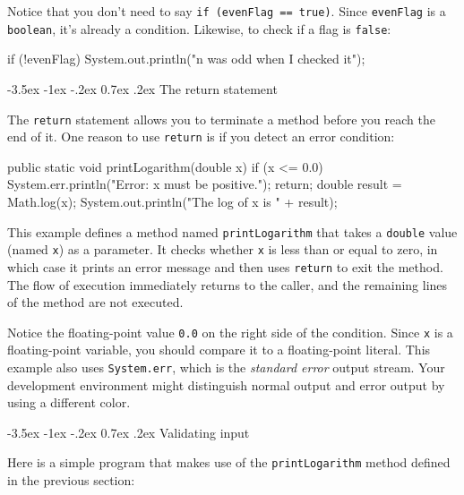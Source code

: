 \documentclass[12pt]{book}
\makeatletter
\theoremstyle{exercise}
\newcommand{\java}[1]{\verb"#1"}
\renewcommand{\section}{\@startsection{section}{1}{\z@}%
    {-3.5ex \@plus -1ex \@minus -.2ex}%
    {0.7ex \@plus.2ex}%
    {\normalfont\Large\bfseries}}
\newcommand{\java}[1]{\lstinline{#1}} %
\makeatother
\begin{document}
Notice that you don't need to say \java{if (evenFlag == true)}.
Since \java{evenFlag} is a \java{boolean}, it's already a condition.
Likewise, to check if a flag is \java{false}:

\begin{code}
    if (!evenFlag) {
        System.out.println("n was odd when I checked it");
    }
\end{code}


\section{The return statement}


The \java{return} statement allows you to terminate a method before you reach the end of it.
One reason to use \java{return} is if you detect an error condition:

\begin{code}
    public static void printLogarithm(double x) {
        if (x <= 0.0) {
            System.err.println("Error: x must be positive.");
            return;
        }
        double result = Math.log(x);
        System.out.println("The log of x is " + result);
    }
\end{code}

This example defines a method named \java{printLogarithm} that takes a \java{double} value (named \java{x}) as a parameter.
It checks whether \java{x} is less than or equal to zero, in which case it prints an error message and then uses \java{return} to exit the method.
The flow of execution immediately returns to the caller, and the remaining lines of the method are not executed.


Notice the floating-point value \java{0.0} on the right side of the condition.
Since \java{x} is a floating-point variable, you should compare it to a floating-point literal.
This example also uses \java{System.err}, which is the {\it standard error} output stream.
Your development environment might distinguish normal output and error output by using a different color.


\section{Validating input}

Here is a simple program that makes use of the \java{printLogarithm} method defined in the previous section:
\end{document}
